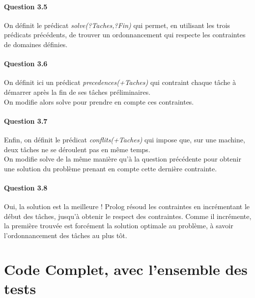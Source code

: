 \documentclass[11pt]{article} %
\begin{document}
\paragraph{Question 3.5}
On définit le prédicat \textit{solve(?Taches,?Fin)} qui permet, en utilisant les trois prédicats précédents, de trouver un ordonnancement qui respecte les contraintes de domaines définies.


\paragraph{Question 3.6}
On définit ici un prédicat \textit{precedences(+Taches)} qui contraint chaque tâche à démarrer après la fin de ses tâches préliminaires.\\ On modifie alors solve pour prendre en compte ces contraintes.


\paragraph{Question 3.7}
Enfin, on définit le prédicat \textit{conflits(+Taches)} qui impose que, sur une machine, deux tâches ne se déroulent pas en même temps.\\ On modifie solve de la même manière qu'à la question précédente pour obtenir une solution du problème prenant en compte cette dernière contrainte.


\paragraph{Question 3.8}
Oui, la solution est la meilleure !
Prolog résoud les contraintes en incrémentant le début des tâches, jusqu'à obtenir le respect des contraintes.
Comme il incrémente, la première trouvée est forcément la solution optimale au problème, à savoir l'ordonnancement des tâches au plus tôt.
\newpage

\section{Code Complet, avec l'ensemble des tests}

\end{document}
